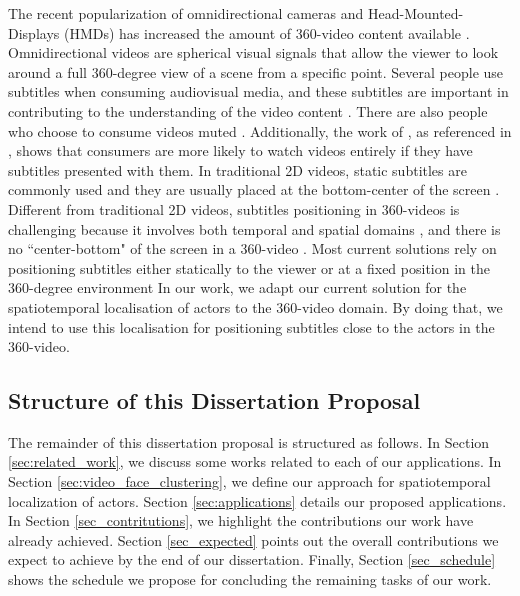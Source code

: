  The recent popularization of omnidirectional cameras and Head-Mounted-Displays (HMDs) has increased the amount of 360-video content available \cite{mendes2020authoring}. Omnidirectional videos are spherical visual signals that allow the viewer to look around a full 360-degree view of a scene from a specific point.
Several people use subtitles when consuming audiovisual media, and these subtitles are important in contributing to the understanding of the video content \cite{brown_subtitles_2017}. There are also people who choose to consume videos muted \cite{hughes_disruptive_2019}. Additionally, the work of \cite{hayati2011effect}, as referenced in \cite{hughes_disruptive_2019}, shows that consumers are more likely to watch videos entirely if they have subtitles presented with them. In traditional 2D videos, static subtitles are commonly used and they are usually placed at the bottom-center of the screen \cite{rothe_dynamic_2018}.
Different from traditional 2D videos, subtitles positioning in 360-videos is challenging because it involves both temporal and spatial domains \cite{agullo2019making}, and there is no ``center-bottom" of the screen in a 360-video \cite{brown_subtitles_2017}. Most current solutions rely on positioning subtitles either statically to the viewer or at a fixed position in the 360-degree environment %
In our work, we adapt our current solution for the spatiotemporal localisation of actors to the 360-video domain. By doing that, we intend to use this localisation for positioning subtitles close to the actors in the 360-video.

\subsection{Structure of this Dissertation Proposal}

The remainder of this dissertation proposal is structured as follows. In Section \ref{sec:related_work}, we discuss some works related to each of our applications.
In Section \ref{sec:video_face_clustering}, we define our approach for spatiotemporal localization of actors.
Section \ref{sec:applications} details our proposed applications. In Section \ref{sec_contritutions}, we highlight the contributions our work have already achieved. Section \ref{sec_expected} points out the overall contributions we expect to achieve by the end of our dissertation. Finally, Section \ref{sec_schedule} shows the schedule we propose for concluding the remaining tasks of our work.

